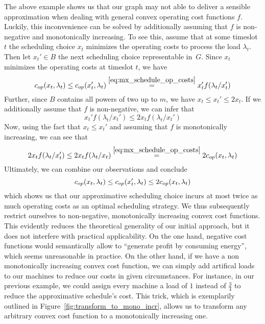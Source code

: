 The above example shows us that our graph may not able to deliver a sensible approximation when dealing with general convex operating cost functions $f$. Luckily, this inconvenience can be solved by additionally assuming that $f$ is non-negative and monotonically increasing. To see this, assume that at some timeslot $t$ the scheduling choice $x_t$ minimizes the operating costs to process the load $\lambda_t$. Then let $x_t'\in B$ the next scheduling choice representable in~$G$. Since $x_t$ minimizes the operating costs at timeslot $t$, we have
\begin{equation*}
	c_{op}(x_t,\lambda_t)\le c_{op}(x_t',\lambda_t)\stackrel{\eqref{eq:mx_schedule_op_costs}}{=}x_t'f(\lambda_t/x_t')
\end{equation*}
Further, since $B$ contains all powers of two up to $m$, we have $x_t\le x_t'\le 2x_t$. If we additionally assume that $f$ is non-negative, we can infer that
\begin{equation*}
	x_t'f(\lambda_t/x_t')\le2x_tf(\lambda_t/x_t')
\end{equation*}
Now, using the fact that $x_t\le x_t'$ and assuming that $f$ is monotonically increasing, we can see that
\begin{equation*}
	2x_tf(\lambda_t/x_t')\le 2x_tf(\lambda_t/x_t)\stackrel{\eqref{eq:mx_schedule_op_costs}}{=}2c_{op}(x_t,\lambda_t)
\end{equation*}
Ultimately, we can combine our observations and conclude
\begin{equation*}
	c_{op}(x_t,\lambda_t)\le c_{op}(x_t',\lambda_t)\le2c_{op}(x_t,\lambda_t)
\end{equation*}
which shows us that our approximative scheduling choice incurs at most twice as much operating costs as an optimal scheduling strategy. We thus subsequently restrict ourselves to non-negative, monotonically increasing convex cost functions. This evidently reduces the theoretical generality of our initial approach, but it does not interfere with practical applicability. On the one hand, negative cost functions would semantically allow to ``generate profit by consuming energy'', which seems unreasonable in practice. On the other hand, if we have a non monotonically increasing convex cost function, we can simply add artifical loads to our machines to reduce our costs in given circumstances. For instance, in our previous example, we could assign every machine a load of $1$ instead of $\frac{3}{4}$ to reduce the approximative schedule's cost. This trick, which is exemplarily outlined in Figure~\ref{fig:transform_to_mono_incr}, allows us to transform any arbitrary convex cost function to a monotonically increasing one.
